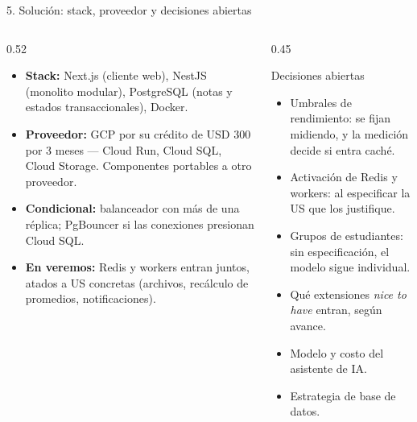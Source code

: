 \documentclass[aspectratio=169,10pt]{beamer}
\newcommand{\st}[1]{\textcolor{academixamber}{\textbf{#1}}}
\begin{document}
\begin{frame}[t]{5. Solución: stack, proveedor y decisiones abiertas}
\small
\vspace{0.15cm}
\begin{columns}[T,onlytextwidth]
\begin{column}{0.52\textwidth}
\begin{itemize}
  \item \st{Stack:} Next.js (cliente web), NestJS (monolito modular), PostgreSQL (notas y estados transaccionales), Docker.
  \item \st{Proveedor:} GCP por su crédito de USD 300 por 3 meses --- Cloud Run, Cloud SQL, Cloud Storage. Componentes portables a otro proveedor.
  \item \st{Condicional:} balanceador con más de una réplica; PgBouncer si las conexiones presionan Cloud SQL.
  \item \st{En veremos:} Redis y workers entran juntos, atados a US concretas (archivos, recálculo de promedios, notificaciones).
\end{itemize}
\end{column}
\begin{column}{0.45\textwidth}
\begin{block}{Decisiones abiertas}
\footnotesize
\begin{itemize}
  \item Umbrales de rendimiento: se fijan midiendo, y la medición decide si entra caché.
  \item Activación de Redis y workers: al especificar la US que los justifique.
  \item Grupos de estudiantes: sin especificación, el modelo sigue individual.
  \item Qué extensiones \emph{nice to have} entran, según avance.
  \item Modelo y costo del asistente de IA.
  \item Estrategia de base de datos.
\end{itemize}
\end{block}
\end{column}
\end{columns}
\end{frame}
\end{document}
